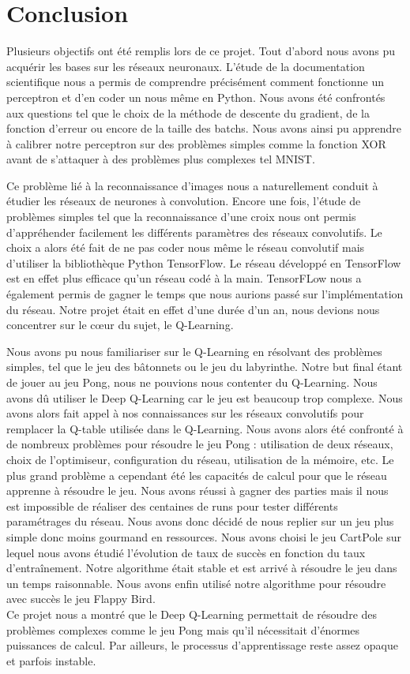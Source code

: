 \section*{Conclusion}

Plusieurs objectifs ont été remplis lors de ce projet. Tout d'abord nous avons pu acquérir les bases sur les réseaux neuronaux. L'étude de la documentation scientifique nous a permis de comprendre précisément comment fonctionne un perceptron et d'en coder un nous même en Python. Nous avons été confrontés aux questions tel que le choix de la méthode de descente du gradient, de la fonction d'erreur ou encore de la taille des batchs. Nous avons ainsi pu apprendre à calibrer notre perceptron sur des problèmes simples comme la fonction XOR avant de s'attaquer à des problèmes plus complexes tel MNIST.

Ce problème lié à la reconnaissance d'images nous a naturellement conduit à étudier les réseaux de neurones à convolution. Encore une fois, l'étude de problèmes simples tel que la reconnaissance d'une croix nous ont permis d'appréhender facilement les différents paramètres des réseaux convolutifs. Le choix a alors été fait de ne pas coder nous même le réseau convolutif mais d'utiliser la bibliothèque Python TensorFlow. Le réseau développé en TensorFlow est en effet plus efficace qu'un réseau codé à la main. TensorFLow nous a également permis de gagner le temps que nous aurions passé sur l'implémentation du réseau. Notre projet était en effet d'une durée d'un an, nous devions nous concentrer sur le c\oe ur du sujet, le Q-Learning.

Nous avons pu nous familiariser sur le Q-Learning en résolvant des problèmes simples, tel que le jeu des bâtonnets ou le jeu du labyrinthe. Notre but final étant de jouer au jeu Pong, nous ne pouvions nous contenter du Q-Learning. Nous avons dû utiliser le Deep Q-Learning car le jeu est beaucoup trop complexe. Nous avons alors fait appel à nos connaissances sur les réseaux convolutifs pour remplacer la Q-table utilisée dans le Q-Learning. Nous avons alors été confronté à de nombreux problèmes pour résoudre le jeu Pong : utilisation de deux réseaux, choix de l'optimiseur, configuration du réseau, utilisation de la mémoire, etc. Le plus grand problème a cependant été les capacités de calcul pour que le réseau apprenne à résoudre le jeu. Nous avons réussi à gagner des parties mais il nous est impossible de réaliser des centaines de runs pour tester différents paramétrages du réseau. Nous avons donc décidé de nous replier sur un jeu plus simple donc moins gourmand en ressources. Nous avons choisi le jeu CartPole sur lequel nous avons étudié l'évolution de taux de succès en fonction du taux d'entraînement. Notre algorithme était stable et est arrivé à résoudre le jeu dans un temps raisonnable. Nous avons enfin utilisé notre algorithme pour résoudre avec succès le jeu Flappy Bird.
\\

Ce projet nous a montré que le Deep Q-Learning permettait de résoudre des problèmes complexes comme le jeu Pong mais qu'il nécessitait d'énormes puissances de calcul. Par ailleurs, le processus d'apprentissage reste assez opaque et parfois instable.